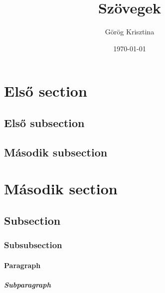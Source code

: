 \documentclass{article}
\title{Szövegek}
\author{Görög Krisztina}
\date{\today}
\begin{document}
\maketitle

\setcounter{secnumdepth}{5}

\section{Első section}
\subsection{Első subsection}
\hulipsum

\subsection{Második subsection}
\hulipsum

\section[Második]{Második section}
\subsection{Subsection}
\subsubsection{Subsubsection}
\paragraph{Paragraph}
\subparagraph{Subparagraph}
\end{document}

